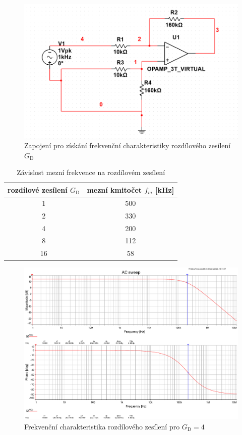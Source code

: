 \documentclass[twoside]{article}
\begin{document}
\begin{figure}[h!]
    \centering
    \includegraphics[width=0.8\linewidth]{rozdilovy_diff.png}
    \caption{Zapojení pro získání frekvenční charakteristiky rozdílového zesílení $G_\text{D}$}
    \label{fig:schema_diff_bode}
\end{figure}

\begin{table}[h!]
    \centering
    \begin{tabular}{c|c}
        rozdílové zesílení $G_\text{D}$ & mezní kmitočet $f_m$ [\si{\kilo\hertz}] \\
        \hline
        1 & 500 \\
        2 & 330 \\
        4 & 200 \\
        8 & 112 \\
        16 & 58
    \end{tabular}
    \caption{Závislost mezní frekvence na rozdílovém zesílení}
    \label{tab:mezni_f}
\end{table}

\begin{figure}[h!]
    \centering
    \includegraphics[width=0.92\linewidth]{bode_diff_4.pdf}
    \caption{Frekvenční charakteristika rozdílového zesílení pro $G_\text{D} = 4$}
    \label{fig:bode_diff_4}
\end{figure}
\end{document}
